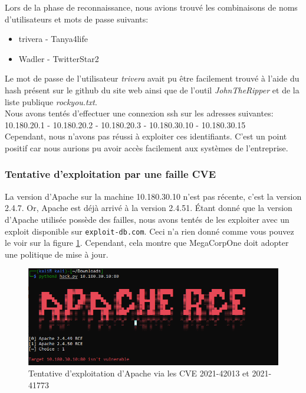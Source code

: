 \documentclass[french,paper=a4,oneside,captions=tableheading]{article}
\begin{document}
Lors de la phase de reconnaissance, nous avions trouvé les combinaisons de noms d'utilisateurs et mots de passe suivants:
\begin{itemize}
    \item trivera - Tanya4life
    \item Wadler - TwitterStar2
\end{itemize}
Le mot de passe de l'utilisateur \textit{trivera} avait pu être facilement trouvé à l'aide du hash présent sur le github du site web ainsi que de l'outil \textit{JohnTheRipper} et de la liste publique \textit{rockyou.txt}.\\
Nous avons tentés d'effectuer une connexion ssh sur les adresses suivantes: 10.180.20.1 - 10.180.20.2 - 10.180.20.3 - 10.180.30.10 - 10.180.30.15\\
Cependant, nous n'avons pas réussi à exploiter ces identifiants. C'est un point positif car nous aurions pu avoir accès facilement aux systèmes de l'entreprise.



\subsubsection{Tentative d'exploitation par une faille CVE}

La version d'Apache sur la machine 10.180.30.10 n'est pas récente, c'est la version 2.4.7. Or, Apache est déjà arrivé à la version 2.4.51. Étant donné que la version d'Apache utilisée possède des failles, nous avons tentés de les exploiter avec un exploit disponible sur \texttt{exploit-db.com}. Ceci n'a rien donné comme vous pouvez le voir sur la figure \ref{fig:apache-exploit-fail}. Cependant, cela montre que MegaCorpOne doit adopter une politique de mise à jour.

\begin{figure}[H]
    \centering
    \includegraphics[width=15cm]{images/apache-exploit-fail.png}
    \caption{Tentative d'exploitation d'Apache via les CVE 2021-42013 et 2021-41773}
    \label{fig:apache-exploit-fail}
\end{figure}
\end{document}
